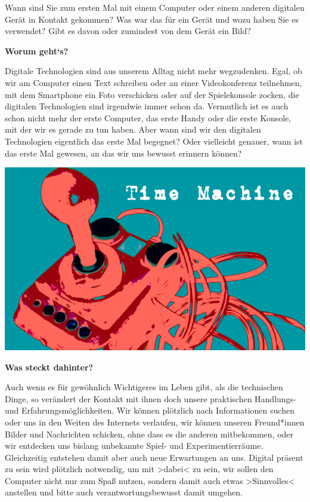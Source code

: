 \documentclass[
  a4paper,
]{book}
\begin{document}
Wann sind Sie zum ersten Mal mit einem Computer oder einem anderen digitalen Gerät in Kontakt gekommen? Was war das für ein Gerät und wozu haben Sie es verwendet? Gibt es davon oder zumindest von dem Gerät ein Bild?

\textbf{Worum geht`s?}

Digitale Technologien sind aus unserem Alltag nicht mehr wegzudenken. Egal, ob wir am Computer einen Text schreiben oder an einer Videokonferenz teilnehmen, mit dem Smartphone ein Foto verschicken oder auf der Spielekonsole zocken, die digitalen Technologien sind irgendwie immer schon da. Vermutlich ist es auch schon nicht mehr der erste Computer, das erste Handy oder die erste Konsole, mit der wir es gerade zu tun haben. Aber wann sind wir den digitalen Technologien eigentlich das erste Mal begegnet? Oder vielleicht genauer, wann ist das erste Mal gewesen, an das wir uns bewusst erinnern können?

\begin{center}\includegraphics{Figures/02-02-TimeMachine} \end{center}

\textbf{Was steckt dahinter?}

Auch wenn es für gewöhnlich Wichtigeres im Leben gibt, als die technischen Dinge, so verändert der Kontakt mit ihnen doch unsere praktischen Handlungs- und Erfahrungsmöglichkeiten. Wir können plötzlich nach Informationen suchen oder uns in den Weiten des Internets verlaufen, wir können unseren Freund*innen Bilder und Nachrichten schicken, ohne dass es die anderen mitbekommen, oder wir entdecken uns bislang unbekannte Spiel- und Experimentierräume. Gleichzeitig entstehen damit aber auch neue Erwartungen an uns. Digital präsent zu sein wird plötzlich notwendig, um mit \textgreater dabei\textless{} zu sein, wir sollen den Computer nicht nur zum Spaß nutzen, sondern damit auch etwas \textgreater Sinnvolles\textless{} anstellen und bitte auch verantwortungsbewusst damit umgehen.
\end{document}
